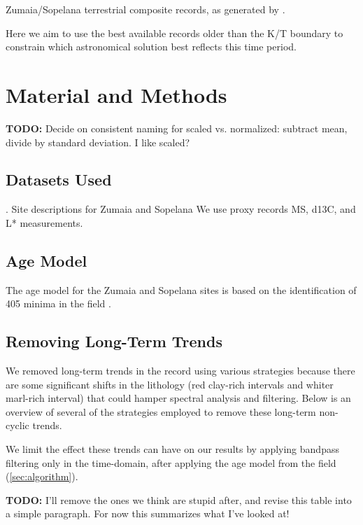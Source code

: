 \documentclass[draft]{agujournal2019}
\begin{document}
Zumaia/Sopelana terrestrial composite records, as generated by
.

Here we aim to use the best available records older than the K/T boundary to
constrain which astronomical solution best reflects this time period.


\section{Material and Methods}\label{sec:mm}

\textbf{TODO:} Decide on consistent naming for scaled vs. normalized:
subtract mean, divide by standard deviation. I like scaled?

\subsection{Datasets Used}\label{sec:data}

.
Site descriptions for Zumaia and Sopelana
We use proxy records \gls{MS}, \gls{d13C}, and \gls{L*} measurements.

\subsection{Age Model}\label{sec:agemodel}

The age model for the Zumaia and Sopelana sites is based on the identification
of \qty{405}{\kiloyear} minima in the field .

\subsection{Removing Long-Term Trends}\label{sec:detrend}

We removed long-term trends in the record using various strategies because
there are some significant shifts in the lithology (red clay-rich intervals and
whiter marl-rich interval) that could hamper spectral analysis and filtering.
Below is an overview of several of the strategies employed to remove these
long-term non-cyclic trends.

We limit the effect these trends can have on our results by applying bandpass
filtering only in the time-domain, after applying the age model from the field
(\cref{sec:algorithm}).

\textbf{TODO:} I'll remove the ones we think are stupid after, and revise this
table into a simple paragraph. For now this summarizes what I've looked at!
\end{document}

